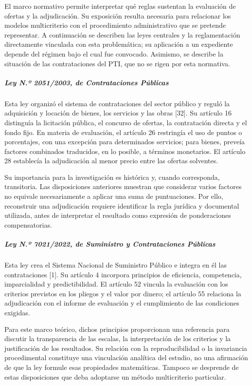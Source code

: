 \documentclass[12pt,a4paper]{article}
\begin{document}
El marco normativo permite interpretar qué reglas sustentan la evaluación de ofertas y la adjudicación. Su exposición resulta necesaria para relacionar los modelos multicriterio con el procedimiento administrativo que se pretende representar. A continuación se describen las leyes centrales y la reglamentación directamente vinculada con esta problemática; su aplicación a un expediente depende del régimen bajo el cual fue convocado. Asimismo, se describe la situación de las contrataciones del PTI, que no se rigen por esta normativa.

\subparagraph{Ley N.º 2051/2003, de Contrataciones Públicas}

Esta ley organizó el sistema de contrataciones del sector público y reguló la adquisición y locación de bienes, los servicios y las obras [32]. Su artículo 16 distinguía la licitación pública, el concurso de ofertas, la contratación directa y el fondo fijo. En materia de evaluación, el artículo 26 restringía el uso de puntos o porcentajes, con una excepción para determinados servicios; para bienes, preveía factores combinados traducidos, en lo posible, a términos monetarios. El artículo 28 establecía la adjudicación al menor precio entre las ofertas solventes.

Su importancia para la investigación es histórica y, cuando corresponda, transitoria. Las disposiciones anteriores muestran que considerar varios factores no equivale necesariamente a aplicar una suma de puntuaciones. Por ello, reconstruir una adjudicación requiere identificar la regla jurídica y documental utilizada, antes de interpretar el resultado como expresión de ponderaciones compensatorias.

\subparagraph{Ley N.º 7021/2022, de Suministro y Contrataciones Públicas}

Esta ley crea el Sistema Nacional de Suministro Público e integra en él las contrataciones [1]. Su artículo 4 incorpora principios de eficiencia, competencia, imparcialidad y predictibilidad. El artículo 52 vincula la evaluación con los criterios previstos en los pliegos y el valor por dinero; el artículo 55 relaciona la adjudicación con el informe de evaluación y el cumplimiento de las condiciones exigidas.

Para este marco teórico, dichos principios proporcionan una referencia para discutir la transparencia de las escalas, la interpretación de los criterios y la justificación de los resultados. Su relación con la reproducibilidad o la invariancia procedimental constituye una vinculación analítica del estudio, no una afirmación de que la ley formule esas propiedades matemáticas. Tampoco se desprende de estas disposiciones que deba adoptarse un método multicriterio particular.
\end{document}
